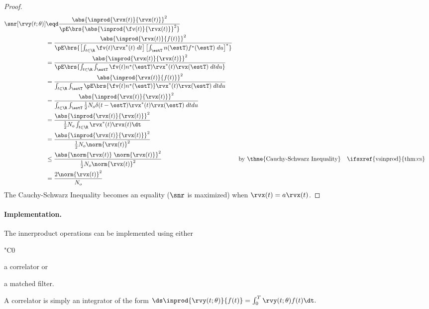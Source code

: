 \begin{proof}
\begin{align*}
   \snr[\rvy(t;\theta)]
     &\eqd \frac{\abs{\inprod{\rvx(t)}{\rvx(t)}}^2}
                {\pE\brs{\abs{\inprod{\fv(t)}{\rvx(t)}}^2}}
   \\&=    \frac{\abs{\inprod{\rvx(t)}{f(t)}}^2}
                {\pE\brs{\left[\int_{t\in\R} \fv(t)\rvx^\ast(t)\;dt\right]
                      \left[\int_{\estT} n(\estT)f^\ast(\estT)\;du\right]^\ast}
                }
   \\&=    \frac{\abs{\inprod{\rvx(t)}{\rvx(t)}}^2}
                {\pE\brs{\int_{t\in\R} \int_{\estT} \fv(t)n^\ast(\estT)\rvx^\ast(t)\rvx(\estT)\;dtdu}}
   \\&=    \frac{\abs{\inprod{\rvx(t)}{f(t)}}^2}
                {\int_{t\in\R} \int_{\estT} \pE\brs{\fv(t)n^\ast(\estT)}\rvx^\ast(t)\rvx(\estT)\;dtdu}
   \\&=    \frac{\abs{\inprod{\rvx(t)}{\rvx(t)}}^2}
                {\int_{t\in\R} \int_{\estT} \frac{1}{2}N_o\delta(t-\estT) \rvx^\ast(t)\rvx(\estT)\;dtdu}
   \\&=    \frac{\abs{\inprod{\rvx(t)}{\rvx(t)}}^2}
                {\frac{1}{2}N_o \int_{t\in\R} \rvx^\ast(t)\rvx(t)\dt}
   \\&=    \frac{\abs{\inprod{\rvx(t)}{\rvx(t)}}^2}
                {\frac{1}{2}N_o \norm{\rvx(t)}^2}
   \\&\le  \frac{\abs{\norm{\rvx(t)}\;\norm{\rvx(t)}}^2}
                {\frac{1}{2}N_o \norm{\rvx(t)}^2}
     &&    \text{by \thme{Cauchy-Schwarz Inequality}}
     &&    \text{\ifsxref{vsinprod}{thm:cs}}
   \\&=    \frac{2\norm{\rvx(t)}^2}
                {N_o }
\end{align*}
The Cauchy-Schwarz Inequality becomes an equality
($\snr$ is maximized) when $\rvx(t)=a\rvx(t)$.
\end{proof}

\paragraph{Implementation.}
The innerproduct operations can be implemented using either
  \begin{dingautolist}{"C0}
     \item a correlator or
     \item a matched filter.
  \end{dingautolist}

A correlator is simply an integrator of the form
   $\ds\inprod{\rvy(t;\theta)}{f(t)} = \int_0^T \rvy(t;\theta)f(t)\dt.$

